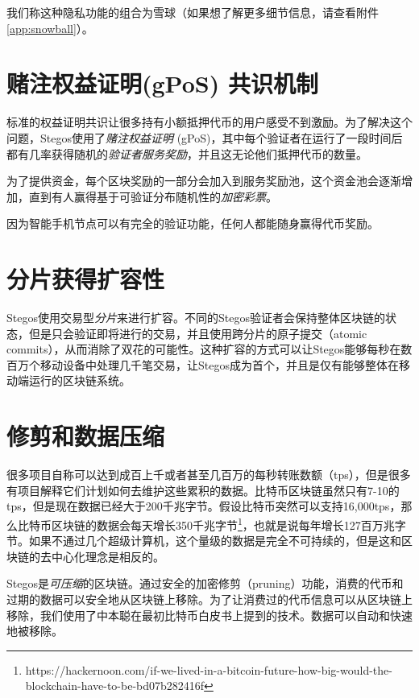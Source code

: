 \documentclass[8pt,fleqn,openany]{book}
\begin{document}
\begin{CJK*}{UTF8}{gbsn}
我们称这种隐私功能的组合为雪球（如果想了解更多细节信息，请查看附件\ref{app:snowball}）。

\section{赌注权益证明(gPoS) 共识机制}

标准的权益证明共识让很多持有小额抵押代币的用户感受不到激励。为了解决这个问题，Stegos使用了\textit{赌注权益证明} (gPoS)，其中每个验证者在运行了一段时间后都有几率获得随机的\textit{验证者服务奖励}，并且这无论他们抵押代币的数量。


为了提供资金，每个区块奖励的一部分会加入到服务奖励池，这个资金池会逐渐增加，直到有人赢得基于可验证分布随机性的\textit{加密彩票}。

因为智能手机节点可以有完全的验证功能，任何人都能随身赢得代币奖励。

\section{分片获得扩容性}
Stegos使用交易型\textit{分片}来进行扩容。不同的Stegos验证者会保持整体区块链的状态，但是只会验证即将进行的交易，并且使用跨分片的原子提交（atomic commits），从而消除了双花的可能性。这种扩容的方式可以让Stegos能够每秒在数百万个移动设备中处理几千笔交易，让Stegos成为首个，并且是仅有能够整体在移动端运行的区块链系统。

\section{修剪和数据压缩}
很多项目自称可以达到成百上千或者甚至几百万的每秒转账数额（tps），但是很多有项目解释它们计划如何去维护这些累积的数据。比特币区块链虽然只有7-10的tps，但是现在数据已经大于200千兆字节。假设比特币突然可以支持16,000tps，那么比特币区块链的数据会每天增长350千兆字节\footnote{https://hackernoon.com/if-we-lived-in-a-bitcoin-future-how-big-would-the-blockchain-have-to-be-bd07b282416f}，也就是说每年增长127百万兆字节。如果不通过几个超级计算机，这个量级的数据是完全不可持续的，但是这和区块链的去中心化理念是相反的。

Stegos是\textit{可压缩}的区块链。通过安全的加密修剪（pruning）功能，消费的代币和过期的数据可以安全地从区块链上移除。为了让消费过的代币信息可以从区块链上移除，我们使用了中本聪在最初比特币白皮书\cite{c1}上提到的技术。数据可以自动和快速地被移除。


\end{CJK*}
\end{document}
